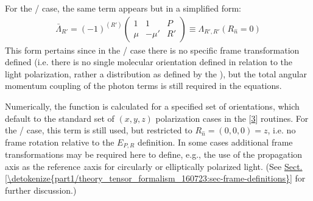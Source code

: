 \documentclass[letterpaper,table,10pt,english]{jupyterBook}
\begin{document}
\sphinxAtStartPar
For the {\hyperref[\detokenize{backmatter/glossary:term-LF}]{}}/{\hyperref[\detokenize{backmatter/glossary:term-AF}]{}} case, the same term appears but in a simplified form:
\begin{equation}\label{equation:part1/theory_tensor_formalism_160723:eq:basis-lambda-LF-defn}
\begin{split}
\bar{\Lambda}_{R'}=(-1)^{(R')}\left(\begin{array}{ccc}
1 & 1 & P\\
\mu & -\mu' & R'
\end{array}\right)\equiv\Lambda_{R',R'}(R_{\hat{n}}=0)
\end{split}
\end{equation}
\sphinxAtStartPar
This form pertains since \sphinxhyphen{} in the {\hyperref[\detokenize{backmatter/glossary:term-LF}]{}}/{\hyperref[\detokenize{backmatter/glossary:term-AF}]{}} case \sphinxhyphen{} there is no specific frame transformation defined (i.e. there is no single molecular orientation defined in relation to the light polarization, rather a distribution as defined by the {\hyperref[\detokenize{backmatter/glossary:term-ADMs}]{}}), but the total angular momentum coupling of the photon terms is still required in the equations.

\sphinxAtStartPar
Numerically, the function is calculated for a specified set of orientations, which default to the standard set of \((x,y,z)\) {\hyperref[\detokenize{backmatter/glossary:term-MF}]{}} polarization cases in the  {[}\hyperlink{cite.backmatter/bibliography:id668}{3}{]} routines. For the {\hyperref[\detokenize{backmatter/glossary:term-LF}]{}}/{\hyperref[\detokenize{backmatter/glossary:term-AF}]{}} case, this term is still used, but restricted to \(R_{\hat{n}} = (0,0,0) = z\), i.e. no frame rotation relative to the {\hyperref[\detokenize{backmatter/glossary:term-LF}]{}} \(E_{P,R}\) definition. In some cases additional frame transformations may be required here to define, e.g., the use of the propagation axis as the reference \(z\)\sphinxhyphen{}axis for circularly or elliptically polarized light. (See \hyperref[\detokenize{part1/theory_tensor_formalism_160723:sec-frame-definitions}]{Sect.\@ \ref{\detokenize{part1/theory_tensor_formalism_160723:sec-frame-definitions}}} for further discussion.)
\end{document}
